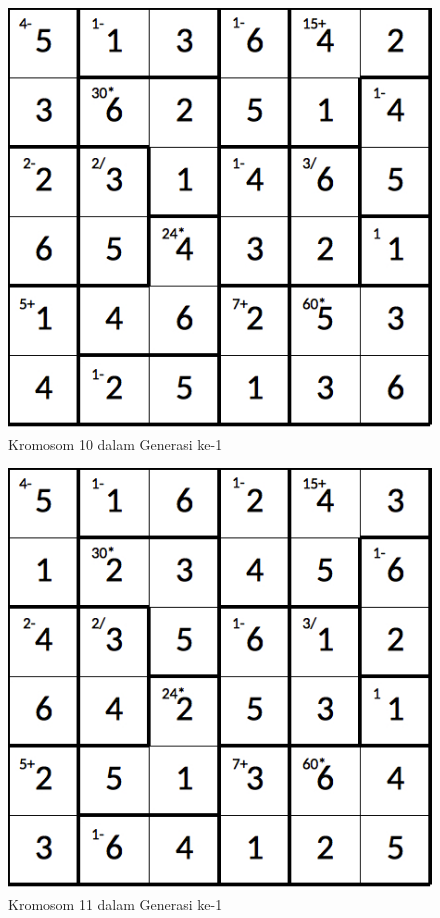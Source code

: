 \begin{figure}
\centering
\captionsetup{justification=centering}
\includegraphics[scale=0.333]{Gambar/hybridgenetic/Generation1Chromosome10}
\caption[Kromosom 10 dalam Generasi ke-1]{Kromosom 10 dalam Generasi ke-1}
\label{fig:analisisg1k10}
\end{figure}

\begin{figure}
\centering
\captionsetup{justification=centering}
\includegraphics[scale=0.333]{Gambar/hybridgenetic/Generation1Chromosome11}
\caption[Kromosom 11 dalam Generasi ke-1]{Kromosom 11 dalam Generasi ke-1}
\label{fig:analisisg1k11}
\end{figure}

